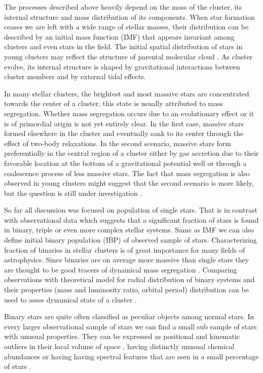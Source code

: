 The processes described above heavily depend on the mass of the cluster, its internal structure and mass distribution of its components. When star formation ceases we are left with a wide range of stellar masses, their distribution can be described by an initial mass function (IMF) \cite{1955ApJ...121..161S} that appears invariant among clusters and even stars in the field. The initial spatial distribution of stars in young clusters may reflect the structure of parental molecular cloud \cite{2015MNRAS.448.1847H}. As cluster evolve, its internal structure is shaped by gravitational interactions between cluster members and by external tidal effects. 

In many stellar clusters, the brightest and most massive stars are concentrated towards the center of a cluster, this state is usually attributed to mass segregation. Whether mass segregation occurs due to an evolutionary effect or it is of primordial origin is not yet entirely clear. In the first case, massive stars formed elsewhere in the cluster and eventually sank to its center through the effect of two-body relaxations. In the second scenario, massive stars form preferentially in the central region of a cluster either by gas accretion due to their favorable location at the bottom of a gravitational potential well or through a coalescence process of less massive stars. The fact that mass segregation is also observed in young clusters might suggest that the second scenario is more likely, but the question is still under investigation \cite{2018MNRAS.473..849D}.

So far all discussion was focused on population of single stars. That is in contrast with observational data which suggests that a significant fraction of stars is found in binary, triple or even more complex stellar systems. Same as IMF we can also define initial binary population (IBP) of observed sample of stars. Characterizing fraction of binaries in stellar clusters is of great importance for many fields of astrophysics. Since binaries are on average more massive than single stars they are thought to be good tracers of dynamical mass segregation \cite{2015arXiv151000099D}. Comparing observations with theoretical model for radial distribution of binary systems and their properties (mass and luminosity ratio, orbital period) distribution can be used to asses dynamical state of a cluster \cite{1999NewA....4..495K}.

Binary stars are quite often classified as peculiar objects \cite{2017ApJS..228...24T} among normal stars. In every larger observational sample of stars we can find a small sub sample of stars with unusual properties. They can be expressed as positional and kinematic outliers in their local volume of space \cite{2010MNRAS.407.2241K, 2011ApJ...728..102W, 2017arXiv171003763C}, having distinctly unusual chemical abundances \cite{1974ARA&A..12..257P} or having having spectral features that are seen in a small percentage of stars \cite{2010AJ....140.1758T}.

